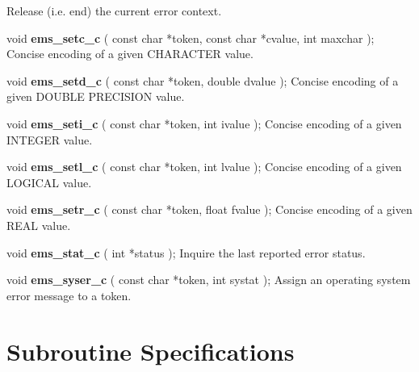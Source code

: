 \begin {description}
\subitem Release (i.e. end) the current error context.
\indexspace
\item void {\bf ems\_setc\_c} ( const char *token, const char *cvalue, 
int maxchar );
\subitem Concise encoding of a given CHARACTER value. 
\indexspace 
\item void {\bf ems\_setd\_c} ( const char *token, double dvalue );
\subitem Concise encoding of a given DOUBLE PRECISION value. 
\indexspace 
\item void {\bf ems\_seti\_c} ( const char *token, int ivalue );
\subitem Concise encoding of a given INTEGER value. 
\indexspace 
\item void {\bf ems\_setl\_c} ( const char *token, int lvalue );
\subitem Concise encoding of a given LOGICAL value. 
\indexspace 
\item void {\bf ems\_setr\_c} ( const char *token, float fvalue );
\subitem Concise encoding of a given REAL value. 
\indexspace 
\item void {\bf ems\_stat\_c} ( int *status );
\subitem Inquire the last reported error status.
\indexspace
\item void {\bf ems\_syser\_c} ( const char *token, int systat );
\subitem Assign an operating system error message to a token.
\end {description}

\newpage
\section {Subroutine Specifications}

